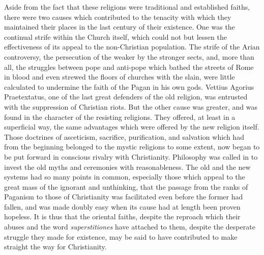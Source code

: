 \documentclass[a4paper, 11pt, oneside, polutonikogreek, french]{article}
\begin{document}
Aside from the fact that these religions were traditional and established faiths, there were two causes which contributed to the tenacity with which they maintained their places in the last century of their existence. One was the continual strife within the Church itself, which could not but lessen the effectiveness of its appeal to the non-Christian population. The strife of the Arian controversy, the persecution of the weaker by the stronger sects, and, more than all, the struggles between pope and anti-pope which bathed the streets of Rome in blood and even strewed the floors of churches with the slain, were little calculated to undermine the faith of the Pagan in his own gods. Vettius Agorius Praetextatus, one of the last great defenders of the old religion, was entrusted with the suppression of Christian riots. But the other cause was greater, and was found in the character of the resisting religions. They offered, at least in a superficial way, the same advantages which were offered by the new religion itself. Those doctrines of asceticism, sacrifice, purification, and salvation which had from the beginning belonged to the mystic religions to some extent, now began to be put forward in conscious rivalry with Christianity. Philosophy was called in to invest the old myths and ceremonies with reasonableness. The old and the new systems had so many points in common, especially those which appeal to the great mass of the ignorant and unthinking, that the passage from the ranks of Paganism to those of Christianity was facilitated even before the former had fallen, and was made doubly easy when its cause had at length been proven hopeless. It is thus that the oriental faiths, despite the reproach which their abuses and the word \emph{superstitiones} have attached to them, despite the desperate struggle they made for existence, may be said to have contributed to make straight the way for Christianity.
\end{document}

